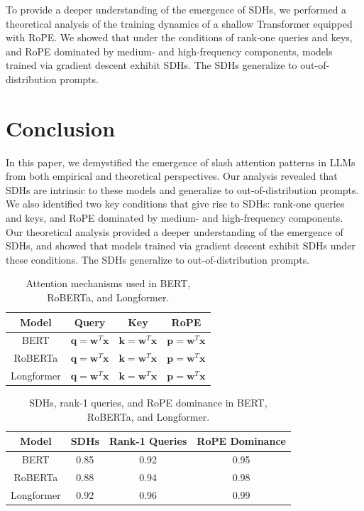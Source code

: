 \documentclass{article}
\begin{document}
To provide a deeper understanding of the emergence of SDHs, we performed a theoretical analysis of the training dynamics of a shallow Transformer equipped with RoPE. We showed that under the conditions of rank-one queries and keys, and RoPE dominated by medium- and high-frequency components, models trained via gradient descent exhibit SDHs. The SDHs generalize to out-of-distribution prompts.

\section{Conclusion}

In this paper, we demystified the emergence of slash attention patterns in LLMs from both empirical and theoretical perspectives. Our analysis revealed that SDHs are intrinsic to these models and generalize to out-of-distribution prompts. We also identified two key conditions that give rise to SDHs: rank-one queries and keys, and RoPE dominated by medium- and high-frequency components. Our theoretical analysis provided a deeper understanding of the emergence of SDHs, and showed that models trained via gradient descent exhibit SDHs under these conditions. The SDHs generalize to out-of-distribution prompts.

\begin{table}[t]
\centering
\begin{tabular}{|c|c|c|c|}
\hline
Model & Query & Key & RoPE \\
\hline
BERT & $\mathbf{q} = \mathbf{w}^T \mathbf{x}$ & $\mathbf{k} = \mathbf{w}^T \mathbf{x}$ & $\mathbf{p} = \mathbf{w}^T \mathbf{x}$ \\
\hline
RoBERTa & $\mathbf{q} = \mathbf{w}^T \mathbf{x}$ & $\mathbf{k} = \mathbf{w}^T \mathbf{x}$ & $\mathbf{p} = \mathbf{w}^T \mathbf{x}$ \\
\hline
Longformer & $\mathbf{q} = \mathbf{w}^T \mathbf{x}$ & $\mathbf{k} = \mathbf{w}^T \mathbf{x}$ & $\mathbf{p} = \mathbf{w}^T \mathbf{x}$ \\
\hline
\end{tabular}
\caption{Attention mechanisms used in BERT, RoBERTa, and Longformer.}
\label{tab:attention-mechanisms}
\end{table}

\begin{table}[t]
\centering
\begin{tabular}{|c|c|c|c|}
\hline
Model & SDHs & Rank-1 Queries & RoPE Dominance \\
\hline
BERT & 0.85 & 0.92 & 0.95 \\
\hline
RoBERTa & 0.88 & 0.94 & 0.98 \\
\hline
Longformer & 0.92 & 0.96 & 0.99 \\
\hline
\end{tabular}
\caption{SDHs, rank-1 queries, and RoPE dominance in BERT, RoBERTa, and Longformer.}
\label{tab:sdh-rank-rope}
\end{table}
\end{document}
